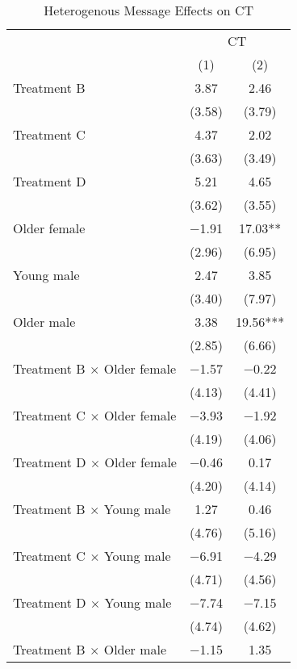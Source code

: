 \documentclass[12pt, a4paper]{article}
\begin{document}
\begin{table}[H]

\caption{\label{tab:test-lm-interaction-reg}Heterogenous Message Effects on CT}
\centering
\fontsize{8}{10}\selectfont
\begin{threeparttable}
\begin{tabular}[t]{lcc}
\toprule
\multicolumn{1}{c}{ } & \multicolumn{2}{c}{CT} \\
\cmidrule(l{3pt}r{3pt}){2-3}
  & (1) & (2)\\
\midrule
Treatment B & \num{3.87} & \num{2.46}\\
 & (\num{3.58}) & (\num{3.79})\\
Treatment C & \num{4.37} & \num{2.02}\\
 & (\num{3.63}) & (\num{3.49})\\
Treatment D & \num{5.21} & \num{4.65}\\
 & (\num{3.62}) & (\num{3.55})\\
Older female & \num{-1.91} & \num{17.03}**\\
 & (\num{2.96}) & (\num{6.95})\\
Young male & \num{2.47} & \num{3.85}\\
 & (\num{3.40}) & (\num{7.97})\\
Older male & \num{3.38} & \num{19.56}***\\
 & (\num{2.85}) & (\num{6.66})\\
Treatment B $\times$ Older female & \num{-1.57} & \num{-0.22}\\
 & (\num{4.13}) & (\num{4.41})\\
Treatment C $\times$ Older female & \num{-3.93} & \num{-1.92}\\
 & (\num{4.19}) & (\num{4.06})\\
Treatment D $\times$ Older female & \num{-0.46} & \num{0.17}\\
 & (\num{4.20}) & (\num{4.14})\\
Treatment B $\times$ Young male & \num{1.27} & \num{0.46}\\
 & (\num{4.76}) & (\num{5.16})\\
Treatment C $\times$ Young male & \num{-6.91} & \num{-4.29}\\
 & (\num{4.71}) & (\num{4.56})\\
Treatment D $\times$ Young male & \num{-7.74} & \num{-7.15}\\
 & (\num{4.74}) & (\num{4.62})\\
Treatment B $\times$ Older male & \num{-1.15} & \num{1.35}\\

\end{tabular}
\end{threeparttable}
\end{table}
\end{document}

